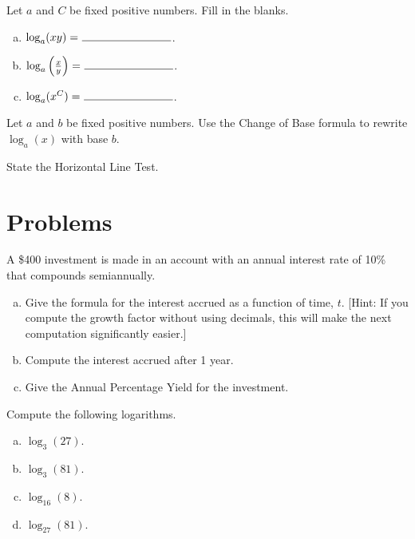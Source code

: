 \documentclass[12pt]{amsart}
\begin{document}
\begin{thm}[3 Points]
  Let $a$ and $C$ be fixed positive numbers.  Fill in the blanks.
  \begin{enumerate}[(a)]
  \item
    $\log_a(xy) = \ \line(1,0){80}$.
  \item
    $\log_a\left(\frac{x}{y}\right) = \ \line(1,0){80}$.
  \item
    $\log_a(x^C) = \ \line(1,0){80}$.
  \end{enumerate}
  \vspace{1in}
\end{thm}

\begin{thm}[2 Points]
  Let $a$ and $b$ be fixed positive numbers.
  Use the Change of Base formula to rewrite $\log_a(x)$ with base $b$.
  \vspace{1in}
\end{thm}

\begin{thm}[1 Point]
  State the Horizontal Line Test.
\end{thm}

\newpage
\section{Problems}

\begin{thm}[16 Points]\label{ex5}
  A \$400 investment is made in an account with an annual interest rate of 10\% that compounds semiannually.
  \begin{enumerate}[(a)]
  \item
    Give the formula for the interest accrued as a function of time, $t$. 
    [Hint: If you compute the growth factor without using decimals, this will make the next computation significantly easier.]
    \vspace{1in}
  \item
    Compute the interest accrued after 1 year.
    \vspace{1in}
  \item
    Give the Annual Percentage Yield for the investment.
    \vspace{1in}
  \end{enumerate}
\end{thm}

\begin{thm}[16 Points]\label{ex10}
  Compute the following logarithms.
  \begin{enumerate}[(a)]
  \item
    $\log_{3}(27)$.
    \vspace{.5in}
  \item
    $\log_{3}(81)$.
    \vspace{.5in}
  \item
    $\log_{16}(8)$.
    \vspace{.5in}
  \item
    $\log_{27}(81)$.
    \vspace{.5in}
  \end{enumerate}
\end{thm}
\end{document}
